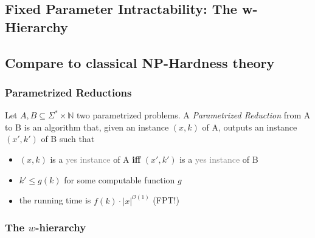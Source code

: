 \subsection{Fixed Parameter Intractability: The w-Hierarchy}
\subsection{Compare to classical NP-Hardness theory}

\subsubsection{Parametrized Reductions}
\begin{definition} Let $A,B\subseteq \Sigma^*\times\mathbb{N}$ two parametrized problems. A \textit{Parametrized Reduction} from A to B is an algorithm that, given an instance $(x,k)$ of A, outputs an instance $(x', k')$ of B such that

    \begin{itemize}
        \item $(x,k)$ is a \textcolor{gray}{yes instance} of A \textbf{iff} $(x',k')$ is a \textcolor{gray}{yes instance} of B
        \item $k' \leq g(k)$ for some computable function $g$
        \item the running time is $f(k)\cdot |x|^{\mathcal{O}(1)}$ (FPT!)
    \end{itemize}
\end{definition}
    \subsubsection{The $w$-hierarchy}

